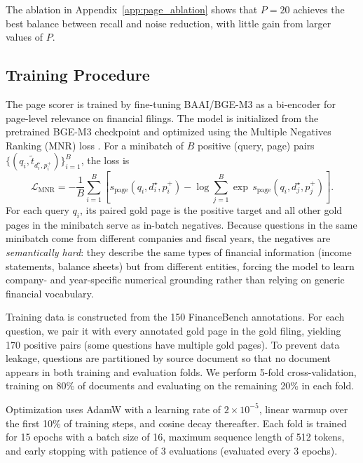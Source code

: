 \documentclass[12pt,twoside,maitrise]{dms}
\theoremstyle{definition}
\numberwithin{equation}{section}
\numberwithin{table}{chapter}
\numberwithin{figure}{chapter}
\begin{document}
The ablation in Appendix~\ref{app:page_ablation} shows that $P=20$ achieves the best
balance between recall and noise reduction, with little gain from larger values of $P$.

\subsection{Training Procedure}
\label{sec:training_procedure}

The page scorer is trained by fine-tuning BAAI/BGE-M3 as a bi-encoder for page-level
relevance on financial filings. The model is initialized from the pretrained BGE-M3
checkpoint and optimized using the Multiple Negatives Ranking (MNR) loss
\citep{henderson2017efficient}. For a minibatch of $B$ positive (query, page) pairs
$\{(q_i, \tilde{t}_{d_i^\star, p_i^+})\}_{i=1}^B$, the loss is
\begin{equation}
  \mathcal{L}_{\text{MNR}} = -\frac{1}{B} \sum_{i=1}^{B}
  \left[
    s_{\text{page}}(q_i, d_i^\star, p_i^+)
    - \log \sum_{j=1}^{B} \exp\, s_{\text{page}}(q_i, d_j^\star, p_j^+)
  \right].
  \label{eq:mnr}
\end{equation}
For each query $q_i$, its paired gold page is the positive target and all other gold
pages in the minibatch serve as in-batch negatives. Because questions in the same
minibatch come from different companies and fiscal years, the negatives are
\emph{semantically hard}: they describe the same types of financial information (income
statements, balance sheets) but from different entities, forcing the model to learn
company- and year-specific numerical grounding rather than relying on generic financial
vocabulary.

Training data is constructed from the 150 FinanceBench annotations. For each question,
we pair it with every annotated gold page in the gold filing, yielding 170 positive pairs
(some questions have multiple gold pages). To prevent data leakage, questions are
partitioned by source document so that no document appears in both training and evaluation
folds. We perform 5-fold cross-validation, training on 80\% of documents and evaluating
on the remaining 20\% in each fold.

Optimization uses AdamW with a learning rate of $2 \times 10^{-5}$, linear warmup over
the first 10\% of training steps, and cosine decay thereafter. Each fold is trained for
15 epochs with a batch size of 16, maximum sequence length of 512 tokens, and early
stopping with patience of 3 evaluations (evaluated every 3 epochs).
\end{document}
